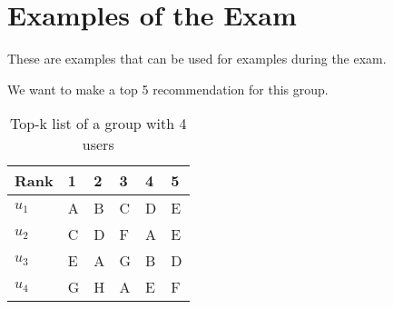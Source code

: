 \newpage
\section*{Examples of the Exam}
These are examples that can be used for examples during the exam.

We want to make a top 5 recommendation for this group.
\begin{table}[h]
\begin{tabular}{|l|lllll|} \hline
Rank  & 1 & 2 & 3 & 4 & 5 \\\hline
$u_1$ & A & B & C & D & E \\
$u_2$ & C & D & F & A & E \\
$u_3$ & E & A & G & B & D \\
$u_4$ & G & H & A & E & F\\\hline
\end{tabular}
\caption{Top-k list of a group with 4 users}
\end{table}




